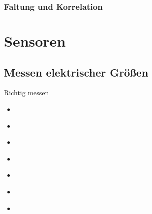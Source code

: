 \documentclass[letterpaper,10pt,english]{jupyterBook}
\begin{document}
\sphinxAtStartPar
{}

\sphinxstepscope


\section{Faltung und Korrelation}
\label{\detokenize{content/5_faltung:faltung-und-korrelation}}\label{\detokenize{content/5_faltung::doc}}
\sphinxstepscope


\part{Sensoren}

\sphinxstepscope


\chapter{Messen elektrischer Größen}
\label{\detokenize{content/4_ElektrischeGroessen:messen-elektrischer-groszen}}\label{\detokenize{content/4_ElektrischeGroessen::doc}}
\sphinxAtStartPar
Richtig messen
\begin{itemize}
\item {} 
\sphinxAtStartPar
{\hyperref[\detokenize{content/4_Grundlagen_Elektronik::doc}]{}}

\item {} 
\sphinxAtStartPar
{\hyperref[\detokenize{content/4_U-Messeingang::doc}]{}}

\item {} 
\sphinxAtStartPar
{\hyperref[\detokenize{content/4_I-Messeingang::doc}]{}}

\item {} 
\sphinxAtStartPar
{\hyperref[\detokenize{content/4_OP::doc}]{}}

\item {} 
\sphinxAtStartPar
{\hyperref[\detokenize{content/4_P-Messung::doc}]{}}

\item {} 
\sphinxAtStartPar
{\hyperref[\detokenize{content/4_R-Messung::doc}]{}}

\item {} 
\sphinxAtStartPar
{\hyperref[\detokenize{content/4_F-Messung::doc}]{}}

\end{itemize}
\end{document}
